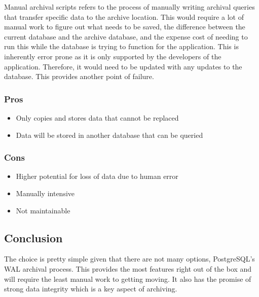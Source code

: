         Manual archival scripts refers to the process of manually writing archival queries that transfer specific data to the archive location.  This would require a lot of manual work to figure out what needs to be saved, the difference between the current database and the archive database, and the expense cost of needing to run this while the database is trying to function for the application.  This is inherently error prone as it is only supported by the developers of the application.  Therefore, it would need to be updated with any updates to the database.  This provides another point of failure.
        
        \subsubsection{Pros}
        \begin{itemize}
            \item Only copies and stores data that cannot be replaced
            \item Data will be stored in another database that can be queried
        \end{itemize}
        
        \subsubsection{Cons}
        \begin{itemize}
            \item Higher potential for loss of data due to human error
            \item Manually intensive
            \item Not maintainable
        \end{itemize}
    
    \subsection{Conclusion}
    
    The choice is pretty simple given that there are not many options, PostgreSQL's WAL archival process.  This provides the most features right out of the box and will require the least manual work to getting moving.  It also has the promise of strong data integrity which is a key aspect of archiving.

